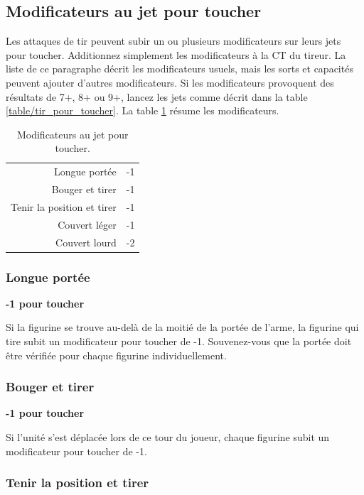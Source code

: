 \subsection{Modificateurs au jet pour toucher}
\label{tir/modificateurs}

Les attaques de tir peuvent subir un ou plusieurs modificateurs sur leurs jets pour toucher. Additionnez simplement les modificateurs à la CT du tireur. La liste de ce paragraphe décrit les modificateurs usuels, mais les sorts et capacités peuvent ajouter d'autres modificateurs. Si les modificateurs provoquent des résultats de 7+, 8+ ou 9+, lancez les jets comme décrit dans la table \ref{table/tir_pour_toucher}. La table \ref{table/modificateur_tir} résume les modificateurs.

\renewcommand{\arraystretch}{1.2}
\begin{table}[!htbp]
\centering
\begin{tabular}{r|c}
Longue portée & -1 \\
Bouger et tirer & -1 \\
Tenir la position et tirer & -1 \\
Couvert léger & -1 \\
Couvert lourd & -2 \\
\end{tabular}
\caption{\label{table/modificateur_tir}Modificateurs au jet pour toucher.}
\end{table}
\renewcommand{\arraystretch}{1.5}

\subsubsection*{Longue portée}

\textbf{-1 pour toucher}

Si la figurine se trouve au-delà de la moitié de la portée de l'arme, la figurine qui tire subit un modificateur pour toucher de -1. Souvenez-vous que la portée doit être vérifiée pour chaque figurine individuellement.

\subsubsection*{Bouger et tirer}

\textbf{-1 pour toucher}

Si l'unité s'est déplacée lors de ce tour du joueur, chaque figurine subit un modificateur pour toucher de -1.

\subsubsection*{Tenir la position et tirer}

